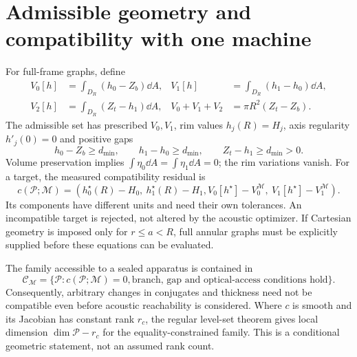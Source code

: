\section{Admissible geometry and compatibility with one machine}
For full-frame graphs, define
\begin{align}
 V_0[h]&=\int_{D_R}(h_0-Z_b)\dd A,&
 V_1[h]&=\int_{D_R}(h_1-h_0)\dd A,\label{eq:volumes}\\
 V_2[h]&=\int_{D_R}(Z_t-h_1)\dd A,&
 V_0+V_1+V_2&=\pi R^2(Z_t-Z_b).
\end{align}
The admissible set has prescribed $V_0,V_1$, rim values $h_j(R)=H_j$,
axis regularity $h'_j(0)=0$ and positive gaps
\begin{equation}
 h_0-Z_b\ge d_{\min},\qquad h_1-h_0\ge d_{\min},\qquad
 Z_t-h_1\ge d_{\min}>0.\label{eq:gaps}
\end{equation}
Volume preservation implies $\int\eta_0\dd A=\int\eta_1\dd A=0$;
the rim variations vanish. For a target, the measured compatibility residual is
\begin{equation}\label{eq:compatibility}
 c(\mathcal P;\mathcal M)=
 (h_0^\star(R)-H_0,\ h_1^\star(R)-H_1,
 V_0[h^\star]-V_0^{\mathcal M},\ V_1[h^\star]-V_1^{\mathcal M}).
\end{equation}
Its components have different units and need their own tolerances.
An incompatible target is rejected, not altered by the acoustic optimizer.
If Cartesian geometry is imposed only for $r\le a<R$, full annular graphs
must be explicitly supplied before these equations can be evaluated.

The family accessible to a sealed apparatus is contained in
\begin{equation}\label{eq:compatible-family}
 \mathcal C_{\mathcal M}=\{\mathcal P:c(\mathcal P;\mathcal M)=0,
 \text{branch, gap and optical-access conditions hold}\}.
\end{equation}
Consequently, arbitrary changes in conjugates and thickness need not be
compatible even before acoustic reachability is considered. Where $c$ is
smooth and its Jacobian has constant rank $r_c$, the regular level-set
theorem gives local dimension $\dim\mathcal P-r_c$ for the equality-constrained
family. This is a conditional geometric statement, not an assumed rank count.


